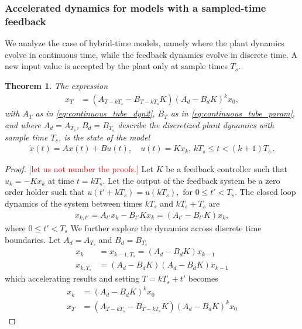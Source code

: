 \documentclass[twocolumn]{autart}    %
\newcommand{\mat}[1]{{#1}}
\renewcommand{\vec}[1]{{#1}}
\newtheorem{theorem}{Theorem}
\newtheorem{proof}{Proof}
\renewcommand{\note}[1]{\textcolor{red}{[#1]}}
\begin{document}
\subsubsection{Accelerated dynamics for models with a sampled-time feedback}\label{sec:real_discrete_feedback_inputs}

We analyze the case of hybrid-time models, 
namely where the plant dynamics evolve in continuous time, 
while the feedback dynamics evolve in discrete time.  
A new input value is accepted by the plant only at sample times $T_s$.
%
\begin{theorem}
The expression
%
 \begin{align}
 \vec{x}_{T} &= (\mat{A}_{T-kT_s}-\mat{B}_{T-kT_s}\mat{K}) (\mat{A}_d-\mat{B}_d\mat{K})^k\vec{x}_0, 
 \label{eq:cyber_feedback}
 \end{align}
%
with $\mat{A}_T$ as in \eqref{eq:continuous_tube_dyn2}, $\mat{B}_T$ as in
\eqref{eq:continuous_tube_param}, and where $\mat{A}_d=\mat{A}_{T_s}$,
$\mat{B}_d=\mat{B}_{T_s}$ describe the discretized plant dynamics with
sample time $T_s$, is the state of the model
%
\begin{align*}
 \dot{\vec{x}}(t) = \mat{A}\vec{x}(t)+\mat{B}\vec{u}(t), \quad 
 \vec{u}(t)=\mat{K}\vec{x}_k,  \,
 kT_s \leq t < (k+1)T_s \,. 
\end{align*}
%
\end{theorem}
\begin{proof}
\note{let us not number the proofs.}
%
Let $\mat{K}$ be a feedback controller such that
$\vec{u}_k=-\mat{K}\vec{x}_k$ at time $t=kT_s$.  Let the output of the
feedback system be a zero order holder such that
$\vec{u}(t'+kT_s)=\vec{u}(kT_s), \text{ for } 0 \leq t' < T_s$.  The closed
loop dynamics of the system between times $kT_s$ and $kT_s+T_s$ are
%
\begin{align*}
\vec{x}_{k,t'}=\mat{A}_{t'}\vec{x}_k-\mat{B}_{t'}\mat{K}\vec{x}_k = (\mat{A}_{t'}-\mat{B}_{t'}\mat{K})\vec{x}_k,
\end{align*}
where $0 \leq t' < T_s$
We further explore the dynamics across discrete time boundaries. Let $\mat{A}_d=\mat{A}_{T_s}$ and $\mat{B}_d=\mat{B}_{T_s}$
\begin{align*}
\vec{x}_{k}&=\vec{x}_{k-1,T_s}= (\mat{A}_d-\mat{B}_d\mat{K})\vec{x}_{k-1}\\
\vec{x}_{k,T_s} &= (\mat{A}_d-\mat{B}_d\mat{K}) (\mat{A}_d-\mat{B}_d\mat{K})\vec{x}_{k-1}
\end{align*}
which accelerating results and setting $T=kT_s+t'$ becomes
\begin{align}
\label{eq:feedback_sampled_cont}
\vec{x}_{k} &= (\mat{A}_d-\mat{B}_d\mat{K}) ^k\vec{x}_0\\
\vec{x}_{T} &= (\mat{A}_{T-kT_s}-\mat{B}_{T-kT_s}\mat{K}) (\mat{A}_d-\mat{B}_d\mat{K})^k\vec{x}_0
\label{eq:feedback_cont}
\end{align}
\end{proof}
\end{document}
